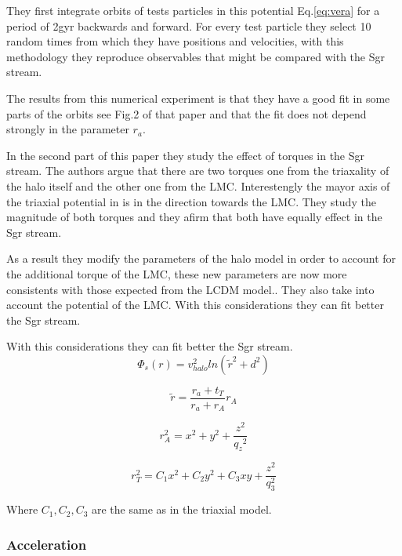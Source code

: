 They first integrate orbits of tests particles in this potential Eq.\ref{eq:vera} for a period of 2gyr backwards and forward. For every test particle they select 10 random times from which they have positions and velocities, with this methodology they reproduce observables that might be compared with the Sgr stream. 

The results from this numerical experiment is that they have a good fit in some 
parts of the orbits see Fig.2 of that paper and that the fit does not depend
strongly in the parameter $r_a$. 

In the second part of this paper they study the effect of torques in the Sgr 
stream. The authors argue that there are two torques one from the triaxality 
of the halo itself and the other one from the LMC. Interestengly the mayor 
axis of the triaxial potential in \citep{Law10} is in the direction towards 
the LMC. They study the magnitude of both torques and they afirm that both 
have equally effect in the Sgr stream. 

As a result they modify the parameters of the halo model in order to account 
for the additional torque of the LMC, these new parameters are now more consistents with those expected from the LCDM model.. They also take into account the 
potential of the LMC. With this considerations they can fit better the Sgr
stream.  

 With this considerations they can fit better the Sgr
stream. 
\begin{equation}\label{ref:vera}
\Phi_s(r) = v_{halo}^2 ln(\tilde{r}^2 + d^2)
\end{equation}

\begin{equation}
\tilde{r} = \dfrac{r_a + t_T}{r_a + r_A}r_A
\end{equation}

\begin{equation}
r_A^2 = x^2 + y^2 + \dfrac{z^2}{{q_z}^2} 
\end{equation}

\begin{equation}
r_T ^ 2 = C_1 x^2 + C_2 y^2 + C_3 xy + \dfrac{z^2}{q_3^2}
\end{equation}

Where $C_1, C_2, C_3$ are the same as in the triaxial model. 

\subsubsection{Acceleration}

